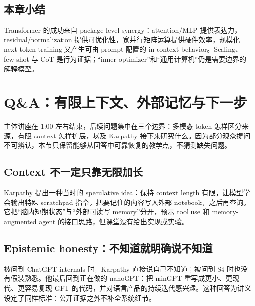 \documentclass[a4paper]{article}
\begin{document}

\subsection{本章小结}

Transformer 的成功来自 package-level synergy：attention/MLP 提供表达力，residual/normalization 提供可优化性，宽并行矩阵运算提供硬件效率，规模化 next-token training 又产生可由 prompt 配置的 in-context behavior。Scaling、few-shot 与 CoT 是行为证据；“inner optimizer”和“通用计算机”仍是需要边界的解释模型。

\section{Q\&A：有限上下文、外部记忆与下一步}

主体讲座在 1:00 左右结束，后续问题集中在三个边界：多模态 token 怎样区分来源，有限 context 怎样扩展，以及 Karpathy 接下来研究什么。因为部分观众提问不可辨认，本节只保留能够从回答中可靠恢复的教学点，不猜测缺失问题。

\subsection{Context 不一定只靠无限加长}

Karpathy 提出一种当时的 speculative idea：保持 context length 有限，让模型学会输出特殊 scratchpad 指令，把要记住的内容写入外部 notebook，之后再查询。它把“脑内短期状态”与“外部可读写 memory”分开，预示 tool use 和 memory-augmented agent 的接口思路，但课堂没有给出实现或实验。


\subsection{Epistemic honesty：不知道就明确说不知道}

被问到 ChatGPT internals 时，Karpathy 直接说自己不知道；被问到 S4 时也没有假装熟悉。他最后回到正在做的 nanoGPT：把 minGPT 重写成更小、更现代、更容易复现 GPT 的代码，并对语言产品的持续迭代感兴趣。这种回答为讲义设定了同样标准：公开证据之外不补全系统细节。
\end{document}
